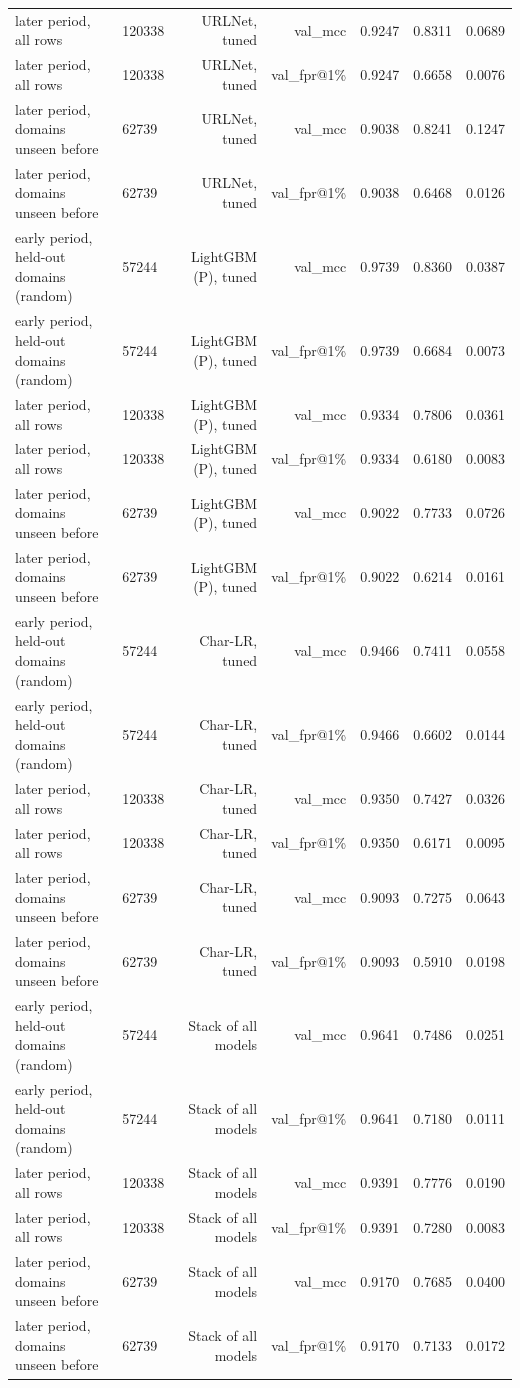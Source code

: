 \begin{table}[t]
\begin{tabular}{llrrrrr}
later period, all rows & 120338 & URLNet, tuned & val\_mcc & 0.9247 & 0.8311 & 0.0689 \\
later period, all rows & 120338 & URLNet, tuned & val\_fpr@1\% & 0.9247 & 0.6658 & 0.0076 \\
later period, domains unseen before & 62739 & URLNet, tuned & val\_mcc & 0.9038 & 0.8241 & 0.1247 \\
later period, domains unseen before & 62739 & URLNet, tuned & val\_fpr@1\% & 0.9038 & 0.6468 & 0.0126 \\
early period, held-out domains (random) & 57244 & LightGBM (P), tuned & val\_mcc & 0.9739 & 0.8360 & 0.0387 \\
early period, held-out domains (random) & 57244 & LightGBM (P), tuned & val\_fpr@1\% & 0.9739 & 0.6684 & 0.0073 \\
later period, all rows & 120338 & LightGBM (P), tuned & val\_mcc & 0.9334 & 0.7806 & 0.0361 \\
later period, all rows & 120338 & LightGBM (P), tuned & val\_fpr@1\% & 0.9334 & 0.6180 & 0.0083 \\
later period, domains unseen before & 62739 & LightGBM (P), tuned & val\_mcc & 0.9022 & 0.7733 & 0.0726 \\
later period, domains unseen before & 62739 & LightGBM (P), tuned & val\_fpr@1\% & 0.9022 & 0.6214 & 0.0161 \\
early period, held-out domains (random) & 57244 & Char-LR, tuned & val\_mcc & 0.9466 & 0.7411 & 0.0558 \\
early period, held-out domains (random) & 57244 & Char-LR, tuned & val\_fpr@1\% & 0.9466 & 0.6602 & 0.0144 \\
later period, all rows & 120338 & Char-LR, tuned & val\_mcc & 0.9350 & 0.7427 & 0.0326 \\
later period, all rows & 120338 & Char-LR, tuned & val\_fpr@1\% & 0.9350 & 0.6171 & 0.0095 \\
later period, domains unseen before & 62739 & Char-LR, tuned & val\_mcc & 0.9093 & 0.7275 & 0.0643 \\
later period, domains unseen before & 62739 & Char-LR, tuned & val\_fpr@1\% & 0.9093 & 0.5910 & 0.0198 \\
early period, held-out domains (random) & 57244 & Stack of all models & val\_mcc & 0.9641 & 0.7486 & 0.0251 \\
early period, held-out domains (random) & 57244 & Stack of all models & val\_fpr@1\% & 0.9641 & 0.7180 & 0.0111 \\
later period, all rows & 120338 & Stack of all models & val\_mcc & 0.9391 & 0.7776 & 0.0190 \\
later period, all rows & 120338 & Stack of all models & val\_fpr@1\% & 0.9391 & 0.7280 & 0.0083 \\
later period, domains unseen before & 62739 & Stack of all models & val\_mcc & 0.9170 & 0.7685 & 0.0400 \\
later period, domains unseen before & 62739 & Stack of all models & val\_fpr@1\% & 0.9170 & 0.7133 & 0.0172 \\
\bottomrule
\end{tabular}
\end{table}
